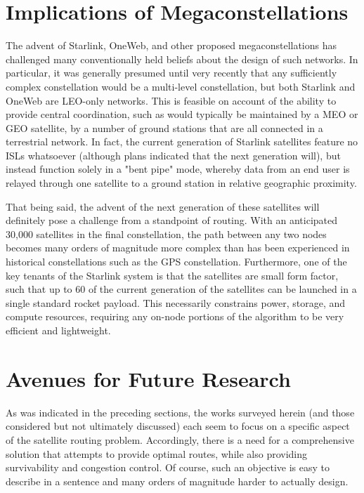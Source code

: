
\section{Implications of Megaconstellations}\label{subsec:megaconstellations}
The advent of Starlink, OneWeb, and other proposed megaconstellations has challenged many conventionally held beliefs about the design of such networks. In particular, it was generally presumed until very recently that any sufficiently complex constellation would be a multi-level constellation, but both Starlink and OneWeb are LEO-only networks. This is feasible on account of the ability to provide central coordination, such as would typically be maintained by a MEO or GEO satellite, by a number of ground stations that are all connected in a terrestrial network. In fact, the current generation of Starlink satellites feature no ISLs whatsoever (although plans indicated that the next generation will), but instead function solely in a "bent pipe" mode, whereby data from an end user is relayed through one satellite to a ground station in relative geographic proximity\cite{chaudhry_laser_2021}.

That being said, the advent of the next generation of these satellites will definitely pose a challenge from a standpoint of routing. With an anticipated 30,000 satellites in the final constellation, the path between any two nodes becomes many orders of magnitude more complex than has been experienced in historical constellations such as the GPS constellation. Furthermore, one of the key tenants of the Starlink system is that the satellites are small form factor, such that up to 60 of the current generation of the satellites can be launched in a single standard rocket payload. This necessarily constrains power, storage, and compute resources, requiring any on-node portions of the algorithm to be very efficient and lightweight.

\section{Avenues for Future Research}\label{futureResearch}
As was indicated in the preceding sections, the works surveyed herein (and those considered but not ultimately discussed) each seem to focus on a specific aspect of the satellite routing problem. Accordingly, there is a need for a comprehensive solution that attempts to provide optimal routes, while also providing survivability and congestion control. Of course, such an objective is easy to describe in a sentence and many orders of magnitude harder to actually design.

